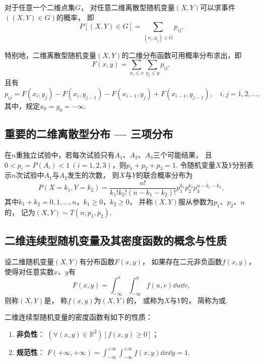 \begin{theorem}
对于任意一个二维点集\(G\)，
对任意二维离散型随机变量\((X,Y)\)可以求事件\(((X,Y) \in G)\)的概率，
即\[
	P\left[(X,Y) \in G\right] = \sum_{(x_i,y_j) \in G} p_{ij}.
\]

特别地，二维离散型随机变量\((X,Y)\)的二维分布函数可用概率分布求出，即\[
	F(x,y) = \sum_{x_i \leq x}\sum_{y_j \leq y} p_{ij},
\]且有\[
	p_{ij} = F(x_i,y_j) - F(x_i,y_{j-1}) - F(x_{i-1},y_j) + F(x_{i-1},y_{j-1}),
	\quad i,j = 1,2,\dotsc,
\]
其中，规定\(x_0 = y_0 = -\infty\).
\end{theorem}

\subsection{重要的二维离散型分布 --- 三项分布}
\begin{definition}
在\(n\)重独立试验中，若每次试验只有\(A_1\)、\(A_2\)、\(A_3\)三个可能结果，
且\(0 < p_i = P(A_i) < 1\ (i=1,2,3)\)，则\(p_1 + p_2 + p_3 = 1\).
令随机变量\(X\)及\(Y\)分别表示\(n\)次试验中\(A_1\)与\(A_2\)发生的次数，
则\(X\)与\(Y\)的联合概率分布为\[
	P(X=k_1,Y=k_2)
	= \frac{n!}{k_1! k_2! (n-k_1-k_2)!} p_1^{k_1} p_2^{k_2} p_3^{n-k_1-k_2},
\]
其中\(k_1+k_2 = 0,1,\dotsc,n\)，\(k_1 \geq 0\)，\(k_2 \geq 0\)，
并称\((X,Y)\)服从参数为\(p _1\)、\(p_2\)、\(n\)的，
记为\((X,Y) \sim T(n;p_1,p_2)\).
\end{definition}

\subsection{二维连续型随机变量及其密度函数的概念与性质}

\begin{definition}
设二维随机变量\((X,Y)\)有分布函数\(F(x,y)\)，
如果存在二元非负函数\(f(x,y)\)，
使得对任意实数\(x\)、\(y\)有\[
	F(x,y) = \int_{-\infty}^x \int_{-\infty}^y f(u,v) \dd{u} \dd{v},
\]
则称\((X,Y)\)是，
称\(f(x,y)\)为\((X,Y)\)的，
或称为\(X\)与\(Y\)的，
简称为或.
\end{definition}

\begin{property}
二维连续型随机变量的密度函数有如下的性质：
\begin{enumerate}
	\item {\bf 非负性}：
	\((\forall (x,y)\in\mathbb{R}^2)[f(x,y) \geq 0]\)；

	\item {\bf 规范性}：
	\(F(+\infty,+\infty)
	= \int_{-\infty}^{+\infty} \int_{-\infty}^{+\infty} f(x,y) \dd{x} \dd{y} = 1\).
\end{enumerate}
\end{property}

